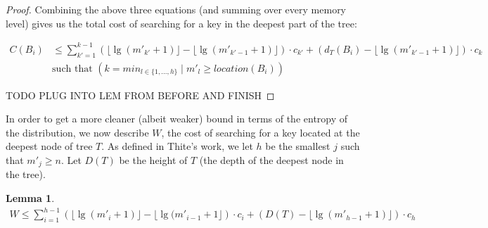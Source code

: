 \documentclass[letterpaper,12pt,titlepage,oneside,final]{book}
\theoremstyle{plain}
\newtheorem{lem}[thm]{Lemma}
\begin{document}
\begin{proof}
Combining the above three equations (and summing over every memory level) gives us the total cost of searching for a key in the deepest part of the tree:

\begin{align*}
C(B_i) &\leq \sum_{k'=1}^{k-1} \left(\lfloor \lg(m'_{k'}+1) \rfloor - \lfloor \lg(m'_{k'-1}+1) \rfloor \right)\cdot c_{k'}+ \left(d_T(B_i) - \lfloor \lg(m'_{k'-1}+1) \rfloor \right)\cdot c_k \\
&\text{such that } \left( k=min_{l \in \{1, ..., h\}} \mid m'_l \geq location(B_i) \right)
\end{align*}

TODO PLUG INTO LEM FROM BEFORE AND FINISH

\end{proof}

In order to get a more cleaner (albeit weaker) bound in terms of the entropy of the distribution, we now describe $W$, the cost of searching for a key located at the deepest node of tree $T$. As defined in Thite's work, we let $h$ be the smallest $j$ such that $m'_j \geq n$. Let $D(T)$ be the height of $T$ (the depth of the deepest node in the tree).

\begin{lem} \label{452}
\begin{align*}
W \leq \sum_{i=1}^{h-1} \left(\lfloor \lg(m'_i+1) \rfloor - \lfloor \lg(m'_{i-1}+1 \rfloor  \right)\cdot c_i+ \left(D(T) - \lfloor \lg(m'_{h-1}+1) \rfloor \right)\cdot c_h
\end{align*}
\end{lem}
\end{document}

